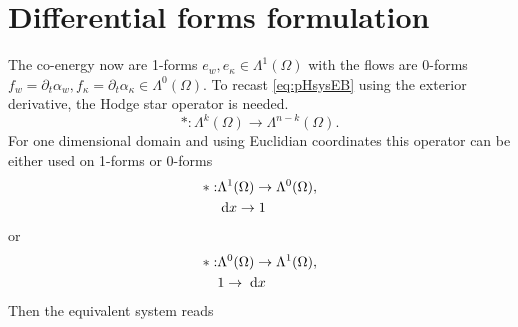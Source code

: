 \documentclass{article}
\begin{document}
\section{Differential forms formulation}

The co-energy now are 1-forms $e_w, e_\kappa \in \Lambda^1(\Omega)$ with the flows are 0-forms $f_w= \partial_t \alpha_w, f_\kappa= \partial_t \alpha_\kappa \in \Lambda^0(\Omega)$. To recast \eqref{eq:pHsysEB} using the exterior derivative, the Hodge star operator is needed.
\begin{equation}
	*: \Lambda^k(\Omega) \rightarrow \Lambda^{n-k}(\Omega).
\end{equation}
For one dimensional domain and using Euclidian coordinates this operator can be either used on 1-forms or 0-forms
\begin{equation}
\begin{aligned}
*: &\Lambda^1(\Omega) \rightarrow \Lambda^0(\Omega), \\
 &\d{x} \rightarrow 1
\end{aligned}
\end{equation}
 or 
\begin{equation}
\begin{aligned}
*: &\Lambda^0(\Omega) \rightarrow \Lambda^1(\Omega), \\
&1 \rightarrow \d{x}
\end{aligned}
\end{equation}
Then the equivalent system reads 
\end{document}
